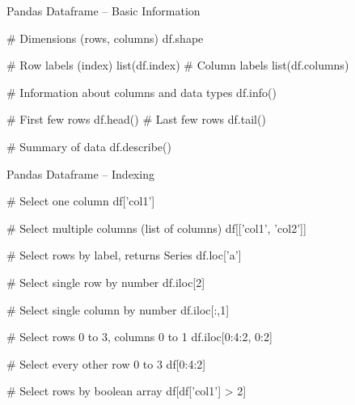 \documentclass[ignorenonframetext,xcolor=x11names]{beamer}
\begin{document}
\begin{frame}[label=full,fragile]{Pandas Dataframe -- Basic Information}
\footnotesize
\begin{pythoncode}
# Dimensions (rows, columns)
df.shape

# Row labels (index)
list(df.index)
# Column labels
list(df.columns)

# Information about columns and data types
df.info()

# First few rows
df.head()
# Last few rows
df.tail()

# Summary of data
df.describe()
\end{pythoncode}
\end{frame}






\begin{frame}[label=full,fragile]{Pandas Dataframe -- Indexing}
\begin{pythoncode}
# Select one column
df['col1']

# Select multiple columns (list of columns)
df[['col1', 'col2']]

# Select rows by label, returns Series
df.loc['a']

# Select single row by number
df.iloc[2]

# Select single column by number
df.iloc[:,1]

# Select rows 0 to 3, columns 0 to 1
df.iloc[0:4:2, 0:2] 

# Select every other row 0 to 3
df[0:4:2]

# Select rows by boolean array
df[df['col1'] > 2]
\end{pythoncode}

\end{frame}
\end{document}
